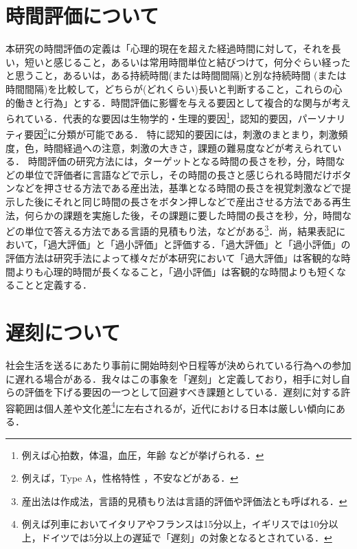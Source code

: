 \section{時間評価について}
本研究の時間評価の定義は「心理的現在を超えた経過時間に対して，それを長い，短いと感じること，あるいは常用時間単位と結びつけて，何分ぐらい経ったと思うこと，あるいは，ある持続時間(または時間間隔)と別な持続時間 (または時間間隔)を比較して，どちらが(どれくらい)長いと判断すること，これらの心的働きと行為」とする\cite{松田2009a}．時間評価に影響を与える要因として複合的な関与が考えられている．代表的な要因は生物学的・生理的要因\footnote{例えば心拍数\cite{松田堀江一川2011}\cite{松田一川橘2015}，体温\cite{松田堀江一川2011}\cite{Hoagland1933}，血圧\cite{松田堀江一川2011}，年齢\cite{Espinosa2003}\cite{一川2009a}\cite{加藤宮澤多田 2006} \cite{和田村田2001}などが挙げられる．}，認知的要因，パーソナリティ要因\footnote{例えば，Type A\cite{Burnam1975}\cite{折原1993}\cite{折原1995}，性格特性\cite{新井1985}\cite{Bell1972}\cite{Campos1966}\cite{Eysenck1959}\cite{今井1965}\cite{岩脇1959}\cite{加藤1967}\cite{Rammsayer1997} \cite{RammsayerRammstedt2000}\cite{ReedKenna1964}\cite{Wudel1979}，不安\cite{Bar-Haim2010}\cite{Hare1963}\cite{村中坂野2000}などがある．}に分類が可能である．
特に認知的要因には，刺激のまとまり\cite{松田1965}，刺激頻度\cite{松田1967}，色\cite{勝浦2007}，時間経過への注意\cite{藤原狩野1994}，刺激の大きさ\cite{Ono2007}\cite{Thomas1975}，課題の難易度\cite{島村篠原長山1991}\cite{篠原2009}などが考えられている．
時間評価の研究方法には，ターゲットとなる時間の長さを秒，分，時間などの単位で評価者に言語などで示し，その時間の長さと感じられる時間だけボタンなどを押させる方法である産出法，基準となる時間の長さを視覚刺激などで提示した後にそれと同じ時間の長さをボタン押しなどで産出させる方法である再生法，何らかの課題を実施した後，その課題に要した時間の長さを秒，分，時間などの単位で答える方法である言語的見積もり法，などがある\cite{一川2008}\footnote{産出法は作成法，言語的見積もり法は言語的評価や評価法とも呼ばれる．}．尚，結果表記において，「過大評価」と「過小評価」と評価する．「過大評価」と「過小評価」の評価方法は研究手法によって様々だが\cite{松田1985}\cite{篠原1996}\cite{加藤宮澤多田2006}本研究において「過大評価」は客観的な時間よりも心理的時間が長くなること，「過小評価」は客観的な時間よりも短くなることと定義する．

\section{遅刻について}
社会生活を送るにあたり事前に開始時刻や日程等が決められている行為への参加に遅れる場合がある．我々はこの事象を「遅刻」と定義しており，相手に対し自らの評価を下げる要因の一つとして回避すべき課題としている．遅刻に対する許容範囲は個人差\cite{drill}や文化差\footnote{例えば列車においてイタリアやフランスは15分以上，イギリスでは10分以上，ドイツでは5分以上の遅延で「遅刻」の対象となるとされている\cite{train}．}に左右されるが，近代における日本は厳しい傾向にある\cite{delay}．

